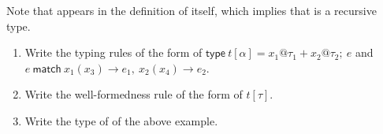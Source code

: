 \begin{enumerate}
Note that  appears in the definition of itself, which implies that
 is a recursive type.

\begin{enumerate}
\item
  Write the typing rules of the form
     of
    $\textsf{type}\ t[\alpha]=x_1@\tau_1+x_2@\tau_2;\ e$ and
    $e\ \textsf{match}\ x_1(x_3)\rightarrow e_1,\ x_2(x_4)\rightarrow e_2$.
\item
  Write the well-formedness rule of the form
    \fbox{$\Gamma\vdash\tau$} of $t[\tau]$.
\item
  Write the type of  of the above example.
\end{enumerate}

\end{enumerate}
